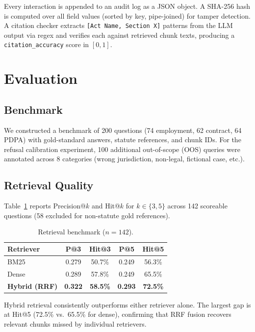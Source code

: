 \documentclass[runningheads]{llncs}
\let\oldsection\section
\renewcommand{\section}{\clearpage\oldsection}
\begin{document}
Every interaction is appended to an audit log as a JSON object. A SHA-256 hash is
computed over all field values (sorted by key, pipe-joined) for tamper detection. A
citation checker extracts \texttt{[Act Name, Section X]} patterns from the LLM output
via regex and verifies each against retrieved chunk texts, producing a
\texttt{citation\_accuracy} score in $[0, 1]$.

\section{Evaluation}

\subsection{Benchmark}

We constructed a benchmark of 200 questions (74 employment, 62 contract, 64 PDPA)
with gold-standard answers, statute references, and chunk IDs. For the refusal
calibration experiment, 100 additional out-of-scope (OOS) queries were annotated
across 8 categories (wrong jurisdiction, non-legal, fictional case, etc.).

\subsection{Retrieval Quality}

Table~\ref{tab:retrieval} reports Precision@$k$ and Hit@$k$ for $k \in \{3, 5\}$
across 142 scoreable questions (58 excluded for non-statute gold references).

\begin{table}[H]
\centering
\caption{Retrieval benchmark ($n=142$).}
\label{tab:retrieval}
\begin{tabular}{lcccc}
\toprule
\textbf{Retriever} & \textbf{P@3} & \textbf{Hit@3} & \textbf{P@5} & \textbf{Hit@5} \\
\midrule
BM25   & 0.279 & 50.7\% & 0.249 & 56.3\% \\
Dense  & 0.289 & 57.8\% & 0.249 & 65.5\% \\
\textbf{Hybrid (RRF)} & \textbf{0.322} & \textbf{58.5\%} & \textbf{0.293} & \textbf{72.5\%} \\
\bottomrule
\end{tabular}
\end{table}

Hybrid retrieval consistently outperforms either retriever alone. The largest gap is
at Hit@5 (72.5\% vs.\ 65.5\% for dense), confirming that RRF fusion recovers relevant
chunks missed by individual retrievers.
\end{document}

